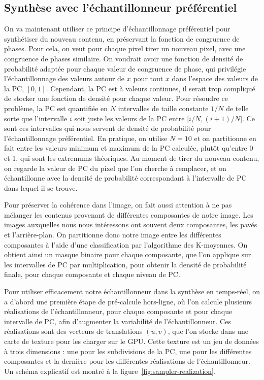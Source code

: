 \subsection{Synthèse avec l'échantillonneur préférentiel}

On va maintenant utiliser ce principe d'échantillonnage préférentiel pour synthétiser du nouveau contenu, en préservant la fonction de congruence de phases. Pour cela, on veut pour chaque pixel tirer un nouveau pixel, avec une congruence de phases similaire. On voudrait avoir une fonction de densité de probabilité adaptée pour chaque valeur de congruence de phase, qui privilégie l'échantillonnage des valeurs autour de $x$ pour tout $x$ dans l'espace des valeurs de la PC, $[0, 1]$. Cependant, la PC est à valeurs continues, il serait trop compliqué de stocker une fonction de densité pour chaque valeur. Pour résoudre ce problème, la PC est quantifiée en $N$ intervalles de taille constante $1/N$ de telle sorte que l'intervalle $i$ soit juste les valeurs de la PC entre $[i/N, (i+1)/N[$. Ce sont ces intervalles qui nous servent de densité de probabilité pour l'échantillonnage préférentiel. En pratique, on utilise $N=10$ et on partitionne en fait entre les valeurs minimum et maximum de la PC calculée, plutôt qu'entre 0 et 1, qui sont les extremums théoriques. Au moment de tirer du nouveau contenu, on regarde la valeur de PC du pixel que l'on cherche à remplacer, et on échantillonne avec la densité de probabilité correspondant à l'intervalle de PC dans lequel il se trouve.

Pour préserver la cohérence dans l'image, on fait aussi attention à ne pas mélanger les contenus provenant de différentes \og composantes \fg de notre image. Les images auxquelles nous nous intéressons ont souvent deux composantes, les pavés et l'arrière-plan. On partitionne donc notre image entre les différentes composantes à l'aide d'une classification par l'algorithme des K-moyennes. On obtient ainsi un masque binaire pour chaque composante, que l'on applique sur les intervalles de PC par multiplication, pour obtenir la densité de probabilité finale, pour chaque composante et chaque niveau de PC.

Pour utiliser efficacement notre échantillonneur dans la synthèse en temps-réel, on a d'abord une première étape de pré-calcule hors-ligne, où l'on calcule plusieurs réalisations de l'échantillonneur, pour chaque composante et pour chaque intervalle de PC, afin d'augmenter la variabilité de l'échantillonneur. Ces réalisations sont des vecteurs de translations $(u, v)$, que l'on stocke dans une carte de texture pour les charger sur le GPU. Cette texture est un jeu de données à trois dimensions : une pour les subdivisions de la PC, une pour les différentes composantes et la dernière pour les différentes réalisations de l'échantillonneur. Un schéma explicatif est montré à la figure~\ref{fig:sampler-realization}.

